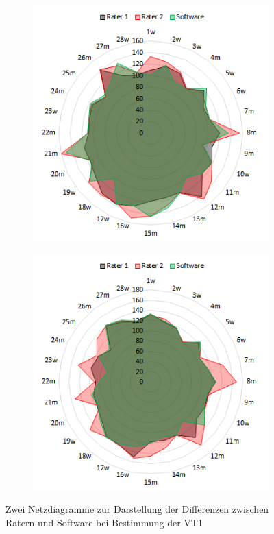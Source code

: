 \begin{figure}[H]
	\centering
	\begin{subfigure}[c]{0.45\textwidth}
		\centering
		\includegraphics[scale=0.73]{Bilder/v-slope_net}
			\label{subpic:pic1}
	\end{subfigure}%
	\hfil
	\begin{subfigure}[c]{0.45\textwidth}
		\centering
		\includegraphics[scale=0.73]{Bilder/eqo2_net}
			\label{subpic:pic2}
	\end{subfigure}
\caption[Netzdiagramme zur Darstellung der Differenzen für VT1]{Zwei Netzdiagramme zur Darstellung der Differenzen zwischen Ratern und Software bei Bestimmung der VT1}
\label{pic:pic22}
\end{figure}
